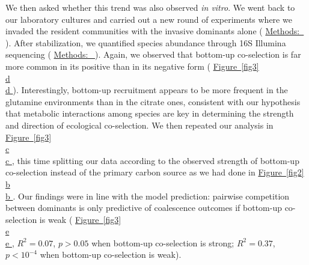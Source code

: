 \documentclass[a4paper,10pt]{article}
\newcommand{\figref}[2][]{%
  \hyperref[{#2}]{%
    Figure~\ref*{#2}%
    \ifx\\#1\\%
    \else
      #1%
    \fi
  }%
}
\newcommand{\methodsref}[1]{%
  \hyperref[{methods:#1}]{%
   Methods:~\nameref*{methods:#1}%
  }%
}
\begin{document}
We then asked whether this trend was also observed \textit{in vitro}.
We went back to our laboratory cultures
and carried out a new round of experiments where we invaded the resident communities
with the invasive dominants alone
(\methodsref{competitions}).
After stabilization, we quantified species abundance through 16S Illumina sequencing
(\methodsref{sequencing}).
Again, we observed that bottom-up co-selection is far more common in its
positive than in its negative form
(\figref[d]{fig3}).
Interestingly, bottom-up recruitment appears to be more frequent in the glutamine
environments than in the citrate ones,
consistent with our hypothesis that metabolic interactions among species
are key in determining the strength and direction of ecological co-selection.
We then repeated our analysis in \figref[c]{fig3},
this time splitting our data according to the observed strength of bottom-up
co-selection instead of the primary carbon source
as we had done in \figref[b]{fig2}.
Our findings were in line with the model prediction:
pairwise competition between dominants is only predictive of coalescence outcomes
if bottom-up co-selection is weak
(\figref[e]{fig3}, $R^2=0.07$, $p>0.05$ when bottom-up co-selection is strong;
$R^2=0.37$, $p<10^{-4}$ when bottom-up co-selection is weak).

\end{document}
